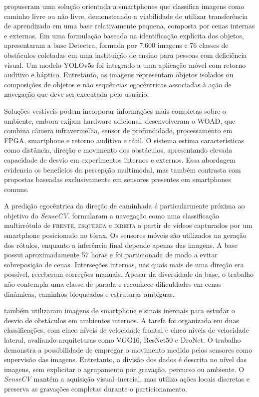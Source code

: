 \documentclass[conference]{IEEEtran}
\newcommand{\sensecv}{\textit{SenseCV}}
\begin{document}
\cite{breve2020} propuseram uma solução orientada a smartphones que classifica imagens como caminho livre ou não livre, demonstrando a viabilidade de utilizar transferência de aprendizado em uma base relativamente pequena, composta por cenas internas e externas. Em uma formulação baseada na identificação explícita dos objetos, \cite{bastidas2025detectra} apresentaram a base Detectra, formada por 7.600 imagens e 76 classes de obstáculos coletadas em uma instituição de ensino para pessoas com deficiência visual. Um modelo YOLOv5s foi integrado a uma aplicação móvel com retorno auditivo e háptico. Entretanto, as imagens representam objetos isolados ou composições de objetos e não sequências egocêntricas associadas à ação de navegação que deve ser executada pelo usuário.

Soluções vestíveis podem incorporar informações mais completas sobre o ambiente, embora exijam hardware adicional. \cite{gao2025} desenvolveram o WOAD, que combina câmera infravermelha, sensor de profundidade, processamento em FPGA, smartphone e retorno auditivo e tátil. O sistema estima características como distância, direção e movimento dos obstáculos, apresentando elevada capacidade de desvio em experimentos internos e externos. Essa abordagem evidencia os benefícios da percepção multimodal, mas também contrasta com propostas baseadas exclusivamente em sensores presentes em smartphones comuns.

A predição egocêntrica da direção de caminhada é particularmente próxima ao objetivo do \sensecv{}. \cite{jadhav2025} formularam a navegação como uma classificação multirrótulo de \textsc{frente}, \textsc{esquerda} e \textsc{direita} a partir de vídeos capturados por um smartphone posicionado no tórax. Os sensores móveis são utilizados na geração dos rótulos, enquanto a inferência final depende apenas das imagens. A base possui aproximadamente 57 horas e foi particionada de modo a evitar sobreposição de cenas. Interseções internas, nas quais mais de uma direção era possível, receberam correções manuais. Apesar da diversidade da base, o trabalho não contempla uma classe de parada e reconhece dificuldades em cenas dinâmicas, caminhos bloqueados e estruturas ambíguas.

\cite{medeiros2021} também utilizaram imagens de smartphone e sinais inerciais para estudar o desvio de obstáculos em ambientes internos. A tarefa foi organizada em duas classificações, com cinco níveis de velocidade frontal e cinco níveis de velocidade lateral, avaliando arquiteturas como VGG16, ResNet50 e DroNet. O trabalho demonstra a possibilidade de empregar o movimento medido pelos sensores como supervisão das imagens. Entretanto, a divisão dos dados é descrita no nível das imagens, sem explicitar o agrupamento por gravação, percurso ou ambiente. O \sensecv{} mantém a aquisição visual--inercial, mas utiliza ações locais discretas e preserva as gravações completas durante o particionamento.
\end{document}
